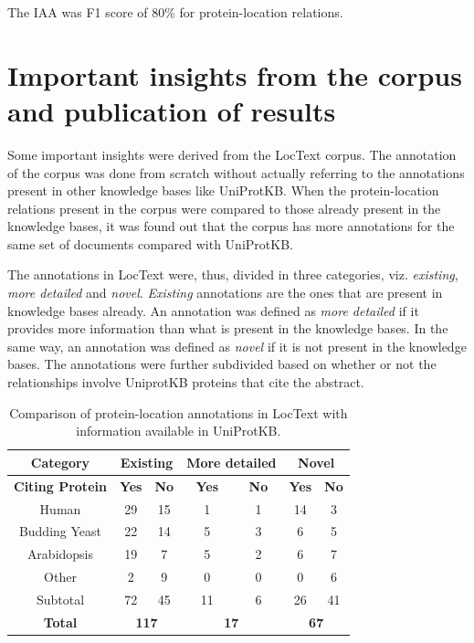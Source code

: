 The IAA was F1 score of 80\% for protein-location relations.

\section{Important insights from the corpus and publication of results}


Some important insights were derived from the LocText corpus. The annotation of the corpus was done from scratch without actually referring to the annotations present in other knowledge bases like UniProtKB. When the protein-location relations present in the corpus were compared to those already present in the knowledge bases, it was found out that the corpus has more annotations for the same set of documents compared with UniProtKB.

The annotations in LocText were, thus, divided in three categories, viz. \textit{existing}, \textit{more detailed} and \textit{novel}. \textit{Existing} annotations are the ones that are present in knowledge bases already. An annotation was defined as \textit{more detailed} if it provides more information than what is present in the knowledge bases. In the same way, an annotation was defined as \textit{novel} if it is not present in the knowledge bases. The annotations were further subdivided based on whether or not the relationships involve UniprotKB proteins that cite the abstract.

\begin{table}
\centering
\begin{tabular}{|c|c|c|c|c|c|c|}
\hline
\textbf{Category} & \multicolumn{2}{c|}{\textbf{Existing}} & \multicolumn{2}{c|}{\textbf{More detailed}} & \multicolumn{2}{c|}{\textbf{Novel}} \\
\hline
\textbf{Citing Protein} & \textbf{Yes} & \textbf{No} & \textbf{Yes} & \textbf{No} & \textbf{Yes} & \textbf{No} \\
\hline
Human & 29 & 15 & 1 & 1 & 14 & 3 \\
Budding Yeast & 22 & 14 & 5 & 3 & 6 & 5 \\
Arabidopsis & 19 & 7 & 5 & 2 & 6 & 7 \\
Other & 2 & 9 & 0 & 0 & 0 & 6 \\
\hline
Subtotal & 72 & 45 & 11 & 6 & 26 & 41 \\
\hline
\textbf{Total} & \multicolumn{2}{c|}{\textbf{117}} & \multicolumn{2}{c|}{\textbf{17}} & \multicolumn{2}{c|}{\textbf{67}} \\
 \hline
\end{tabular}
\caption{Comparison of protein-location annotations in LocText with information available in UniProtKB.}\label{tab:novelAnnotation}
\end{table}

